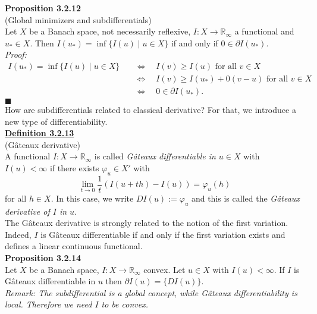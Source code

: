 \textbf{Proposition 3.2.12}\\
(Global minimizers and subdifferentials)\\
Let $X$ be a Banach space, not necessarily reflexive, $I:X\longrightarrow\mathbb{R}_\infty$ a functional and $u_*\in X$. Then $I(u_*)=\inf\{I(u)\mid u\in X\}$ if and only if $0\in\partial I(u_*)$.\\

\textit{Proof:}
\begin{align*}
	I(u_*)=\inf\{I(u)\mid u\in X\}\quad&\Longleftrightarrow\quad I(v)\geq I(u)\text{ for all }v\in X\\
	&\Longleftrightarrow\quad I(v)\geq I(u_*)+0(v-u)\text{ for all }v\in X\\
	&\Longleftrightarrow\quad0\in\partial I(u_*).
\end{align*}
\hfill$\blacksquare$\\[11pt]

How are subdifferentials related to classical derivative? For that, we introduce a new type of differentiability.\\

\textbf{\underline{Definition 3.2.13}}\\
(G\^ateaux derivative)\\
A functional $I:X\longrightarrow\mathbb{R}_\infty$ is called \textit{G\^ateaux differentiable in $u\in X$} with $I(u)<\infty$ if there exists $\varphi_u\in X'$ with
\[\lim_{t\to0}{\frac{1}{t}(I(u+th)-I(u))}=\varphi_u(h)\]
for all $h\in X$. In this case, we write $DI(u):=\varphi_u$ and this is called the \textit{G\^ateaux derivative of $I$ in $u$}.\\[11pt]

The G\^ateaux derivative is strongly related to the notion of the first variation. Indeed, $I$ is G\^ateaux differentiable if and only if the first variation exists and defines a linear continuous functional.\\[11pt]

\textbf{Proposition 3.2.14}\\
Let $X$ be a Banach space, $I:X\longrightarrow\mathbb{R}_\infty$ convex. Let $u\in X$ with $I(u)<\infty$. If $I$ is G\^ateaux differentiable in $u$ then $\partial I(u)=\{DI(u)\}$.\\

\textit{Remark: The subdifferential is a global concept, while G\^ateaux differentiability is local. Therefore we need $I$ to be convex.}\\

